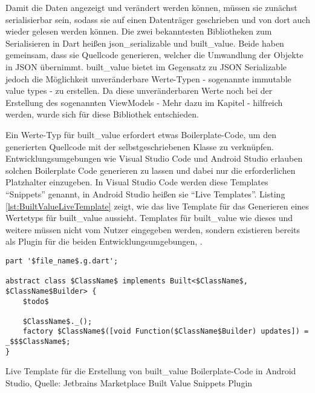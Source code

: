 Damit die Daten angezeigt und verändert werden können, müssen sie zunächst serialisierbar sein, sodass sie auf einen Datenträger geschrieben und von dort auch wieder gelesen werden können.
Die zwei bekanntesten Bibliotheken zum Serialisieren in Dart heißen json_serializable und built_value.
Beide haben gemeinsam, dass sie Quellcode generieren, welcher die Umwandlung der Objekte in JSON übernimmt.
built_value bietet im Gegensatz zu JSON Serializable jedoch die Möglichkeit unveränderbare Werte-Typen -  sogenannte immutable value types -  zu erstellen. Da diese  unveränderbaren Werte noch bei der Erstellung des sogenannten ViewModels -  Mehr dazu im Kapitel  - hilfreich werden, wurde sich für diese Bibliothek entschieden.

Ein Werte-Typ für built_value erfordert etwas Boilerplate-Code,  um den generierten Quellcode mit der selbstgeschriebenen Klasse zu verknüpfen.
Entwicklungsumgebungen wie Visual Studio Code und Android Studio erlauben solchen Boilerplate Code generieren zu lassen und dabei nur die erforderlichen Platzhalter einzugeben.
In Visual Studio Code werden diese Templates \enquote{Snippets} genannt, in Android Studio heißen sie \enquote{Live Templates}.  Listing \ref{lst:BuiltValueLiveTemplate} zeigt, wie das live Template für das Generieren eines Wertetyps  für built_value aussieht. Templates für built_value wie dieses und weitere müssen nicht vom Nutzer eingegeben werden, sondern existieren bereits als Plugin für die beiden Entwicklungsumgebungen, .


\ifincludeall
  \begin{listing}[h]
    \begin{verbatim}
part '$file_name$.g.dart';

abstract class $ClassName$ implements Built<$ClassName$, $ClassName$Builder> {
    $todo$
    
    $ClassName$._();
    factory $ClassName$([void Function($ClassName$Builder) updates]) = _$$$ClassName$;
}

\end{verbatim}
    \caption[built_value Live Template]{Live Template für die Erstellung von built_value Boilerplate-Code in Android Studio, Quelle: Jetbrains Marketplace Built Value Snippets Plugin}
    \label{lst:BuiltValueLiveTemplate}
  \end{listing}
\fi

